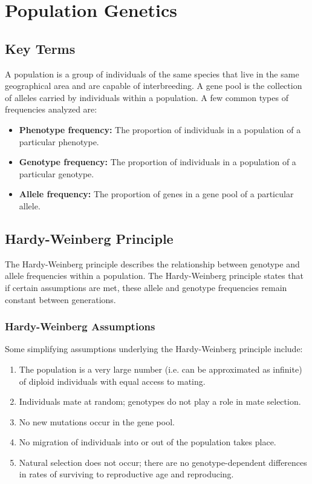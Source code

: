 \documentclass[12pt,titlepage]{article}
\begin{document}
  \newpage

  \section{Population Genetics}

    \subsection{Key Terms}
      A population is a group of individuals of the same species that live in the same geographical area and are capable of interbreeding. A gene
      pool is the collection of alleles carried by individuals within a population. A few common types of frequencies analyzed are:
      \begin{itemize}
        \item \textbf{Phenotype frequency:} The proportion of individuals in a population of a particular phenotype.
        \item \textbf{Genotype frequency:} The proportion of individuals in a population of a particular genotype.
        \item \textbf{Allele frequency:} The proportion of genes in a gene pool of a particular allele.
      \end{itemize}

    \subsection{Hardy-Weinberg Principle}
      The Hardy-Weinberg principle describes the relationship between genotype and allele frequencies within a population. The Hardy-Weinberg
      principle states that if certain assumptions are met, these allele and genotype frequencies remain constant between generations.

      \subsubsection{Hardy-Weinberg Assumptions}
        Some simplifying assumptions underlying the Hardy-Weinberg principle include:
        \begin{enumerate}
          \item The population is a very large number (i.e. can be approximated as infinite) of diploid individuals with equal access to mating.
          \item Individuals mate at random; genotypes do not play a role in mate selection.
          \item No new mutations occur in the gene pool.
          \item No migration of individuals into or out of the population takes place.
          \item Natural selection does not occur; there are no genotype-dependent differences in rates of surviving to reproductive age and reproducing.
        \end{enumerate}
\end{document}
